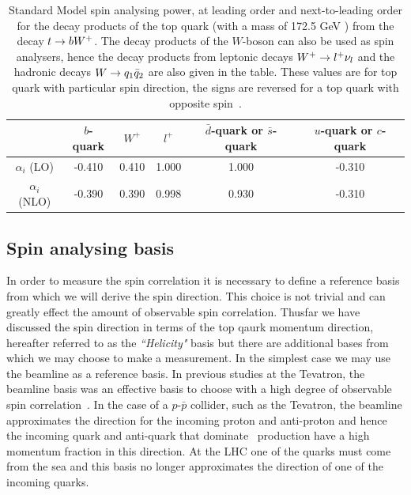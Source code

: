\begin{table}[htbp]
\begin{center}
\begin{tabular}{|c||c|c||c||c|c|}
\hline
                 & $b$-quark & $W^+$ & $l^+$ & $\bar{d}$-quark or $\bar{s}$-quark& $u$-quark or $c$-quark\\
\hline
$\alpha_i$ (LO)  & -0.410    & 0.410 & 1.000 & 1.000                             & -0.310 \\
$\alpha_i$ (NLO) & -0.390    & 0.390 & 0.998 & 0.930                             & -0.310 \\
\hline
\end{tabular}
\end{center}
\caption{Standard Model spin analysing power, at leading order and next-to-leading order for the decay products of the top quark (with a mass of 172.5 GeV ) from the decay $t \rightarrow bW^+$.  The decay products of the $W$-boson can also be used as spin analysers, hence the decay products from leptonic decays $W^+ \rightarrow l^+\nu_l$ and the hadronic decays $W \rightarrow q_1\bar{q}_2$ are also given in the table. These values are for top quark with particular spin direction, the signs are reversed for a top quark with opposite spin~\cite{hubaut, Czarnecki:1990pe, Brandenburg:2002xr}.}
\label{tab:alphas}
\end{table}

\subsection{Spin analysing basis}
\label{sec:spinanalysingbasis}
In order to measure the spin correlation it is necessary to define a reference basis from which we will derive the spin direction. This choice is not trivial and can greatly effect the amount of observable spin correlation. Thusfar we have discussed the spin direction in terms of the top qaurk momentum direction, hereafter referred to as the \emph{``Helicity"} basis but there are additional bases from which we may choose to make a measurement. In the simplest case we may use the beamline as a reference basis. In previous studies at the Tevatron, the beamline basis was an effective basis to choose with a high degree of observable spin correlation~\cite{TEVATRONSPIN,BEAMLINE DESCRIPTION}. In the case of a $p$-$\bar{p}$ collider, such as the Tevatron, the beamline approximates the direction for the incoming proton and anti-proton and hence the incoming quark and anti-quark that dominate \ttbar\ production have a high momentum fraction in this direction. At the LHC one of the quarks must come from the sea and this basis no longer approximates the direction of one of the incoming quarks.



